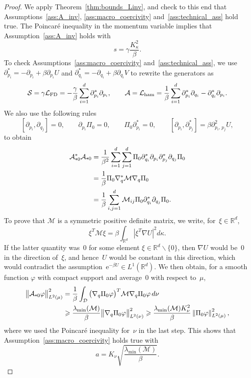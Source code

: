 \documentclass[AHL,Unicode,longabstracts,MathTools,published]{cedram}
\newcommand{\rme}{\mathrm{e}}
\newcommand{\cLs}{\mathcal{S}}
\newcommand{\cLa}{\mathcal{A}}
\newcommand{\cD}{\mathcal{D}}
\newcommand{\cLM}{\mathcal{M}}
\newcommand{\R}{\mathbb{R}}
\newcommand{\cLham}{\mathcal{L}_{\rm ham}}
\newcommand{\cLFD}{\mathcal{L}_{\rm FD}}
\newcommand{\subplus}{\textnormal{\texttt{+}}}
\renewcommand{\geq}{\geqslant}
\begin{document}
\begin{proof}
We apply Theorem~\ref{thm:bounds_Linv}, and check to this end that Assumptions~\ref{ass:A_inv}, \ref{ass:macro_coercivity} and~\ref{ass:technical_ass} hold true. The Poincaré inequality in the momentum variable implies that Assumption~\ref{ass:A_inv} holds with
\[
s = \gamma \frac{K_\kappa^2}{\beta}.
\]
To check Assumptions~\ref{ass:macro_coercivity} and~\ref{ass:technical_ass}, we use $\partial_{p_i}^* = -\partial_{p_i} + \beta \partial_{p_i} U$ and $\partial_{q_i}^* = -\partial_{q_i} + \beta \partial_{q_i} V$ to rewrite the generators as
\[
\cLs = \gamma \cLFD = -\frac \gamma \beta \sum_{i=1}^d \partial_{p_i}^* \partial_{p_i},
\qquad \cLa = \cLham = \frac{1}{\beta} \sum_{i=1}^d \partial_{p_i}^* \partial_{q_i} - \partial_{q_i}^* \partial_{p_i}.
\]
We also use the following rules
\[
\left[\partial_{p_{i}}, \partial_{q_{j}}\right] = 0, \qquad \partial_{p_i} \Pi_0 = 0, \qquad \Pi_0 \partial_{p_i}^* = 0, \qquad \left[\partial_{p_i},\partial_{p_j}^*\right] = \beta \partial_{p_i,\,p_j}^2 U,
\]
to obtain
\begin{equation}\label{eq:A^*A_Langevin}
\begin{split}
\cLa_{\subplus 0}^*\cLa_{\subplus 0} &= \frac 1 {\beta^{2}} \sum_{i=1}^{d} \sum_{j=1}^{d} \Pi_{0} \partial_{q_{i}}^{*} \partial_{p_{i}} \partial_{p_{j}}^{*} \partial_{q_{j}} \Pi_{0}\\
 &= \frac1\beta \Pi_{0} \nabla_q^* \cLM \nabla_q \Pi_0 \\
& = \frac1\beta \sum_{i,j=1}^d \cLM_{ij} \Pi_{0} \partial_{q_i}^* \partial_{q_j} \Pi_0.
\end{split}
\end{equation}
To prove that $\cLM$ is a symmetric positive definite matrix, we write, for~$\xi \in \R^d$,
\[
\xi^T \cLM \xi = \beta \int_{\R^d} \left|\xi^T \nabla U\right|^2 d\kappa.
\]
If the latter quantity was~0 for some element $\xi \in \R^d \backslash \{0\}$, then $\nabla U$ would be~0 in the direction of~$\xi$, and hence~$U$ would be constant in this direction, which would contradict the assumption~$\rme^{-\beta U} \in L^1(\R^d)$. We then obtain, for a smooth function $\varphi$ with compact support and average~0 with respect to~$\mu$,
\begin{align*}
\big\|\cLa_{\subplus 0}\varphi\big\|_{L^2(\mu)}^2 & = \frac{1}{\beta}\int_\cD \big(\nabla_q \Pi_0 \varphi\big)^T \cLM \nabla_q \Pi_0 \varphi \, d\nu \\
& \geq \frac{\lambda_{\min}(\cLM)}{\beta} \big\| \nabla_q \Pi_0 \varphi \big\|^2_{L^2(\nu)} \geq \frac{\lambda_{\min}(\cLM) K_\nu^2}{\beta} \left\|\Pi_0 \varphi\right\|_{L^2(\mu)}^2,
\end{align*}
where we used the Poincaré inequality for~$\nu$ in the last step. This shows that Assumption~\ref{ass:macro_coercivity} holds true with
\[
a = K_\nu \sqrt{\frac{\lambda_{\min}(\cLM)}{\beta}}.
\]


\end{proof}
\end{document}
